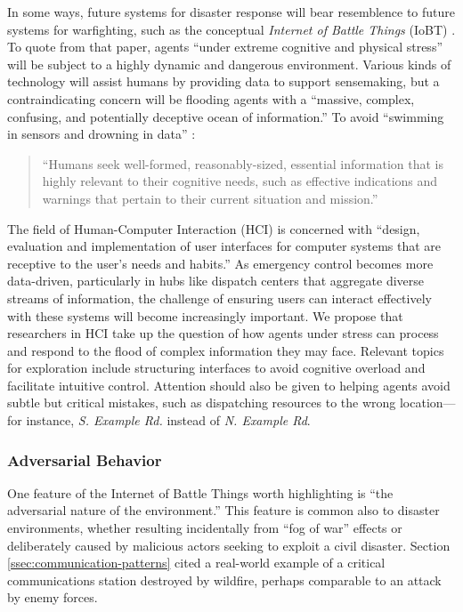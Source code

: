 \documentclass[]             %
{NASA}                       %
\theoremstyle{definition}
\begin{document}
In some ways, future systems for disaster response will bear
resemblence to future systems for warfighting, such as the conceptual
\emph{Internet of Battle Things} (IoBT) \cite{2016:iobt}. To quote
from that paper, agents ``under extreme cognitive and physical
stress'' will be subject to a highly dynamic and dangerous
environment. Various kinds of technology will assist humans by
providing data to support sensemaking, but a contraindicating concern
will be flooding agents with a ``massive, complex, confusing, and
potentially deceptive ocean of information.'' To avoid ``swimming in
sensors and drowning in data'' \cite{2010:magnuson}:
\begin{quote}
``Humans seek well-formed, reasonably-sized, essential information
  that is highly relevant to their cognitive needs, such as effective
  indications and warnings that pertain to their current situation and
  mission.'' \cite{2016:iobt}
\end{quote}

The field of Human-Computer Interaction (HCI) is concerned with
``design, evaluation and implementation of user interfaces for
computer systems that are receptive to the user's needs and habits.''
\cite{2009:hci-definition} As emergency control becomes more
data-driven, particularly in hubs like dispatch centers that aggregate
diverse streams of information, the challenge of ensuring users can
interact effectively with these systems will become increasingly
important. We propose that researchers in HCI take up the question of
how agents under stress can process and respond to the flood of
complex information they may face. Relevant topics for exploration
include structuring interfaces to avoid cognitive overload and
facilitate intuitive control. Attention should also be given to
helping agents avoid subtle but critical mistakes, such as dispatching
resources to the wrong location---for instance, \emph{S. Example Rd.}
instead of \emph{N. Example Rd}.


\subsubsection{Adversarial Behavior}
One feature of the Internet of Battle Things worth highlighting is
``the adversarial nature of the environment.'' This feature is common
also to disaster environments, whether resulting incidentally from
``fog of war'' effects or deliberately caused by malicious actors
seeking to exploit a civil disaster. Section
\ref{ssec:communication-patterns} cited a real-world example of a
critical communications station destroyed by wildfire, perhaps
comparable to an attack by enemy forces.
\end{document}
